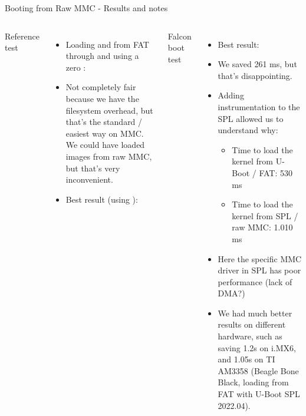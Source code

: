 \begin{frame}{Booting from Raw MMC - Results and notes}
  \scriptsize
  \begin{columns}
         Reference test
        \begin{itemize}
           \item Loading  and  from FAT through
                  and using a zero :\\
           \item Not completely fair because we have the filesystem overhead, but that's the standard / easiest way on MMC.
                 We could have loaded images from raw MMC, but that's very inconvenient.
           \item Best result (using ):\\
        \end{itemize}
        Falcon boot test
        \begin{itemize}
           \item Best result:\\
           \item We saved 261 ms, but that's disappointing.
           \item Adding instrumentation to the SPL allowed us to understand why:
           \begin{itemize}
              \scriptsize
              \item Time to load the kernel from U-Boot / FAT: 530 ms
              \item Time to load the kernel from SPL / raw MMC: 1.010 ms
           \end{itemize}
           \item Here the specific MMC driver in SPL has poor performance (lack
                 of DMA?)
           \item We had much better results on different hardware, such
                 as saving 1.2s on i.MX6, and 1.05s on TI AM3358
                 (Beagle Bone Black, loading from FAT with U-Boot SPL
                 2022.04).
        \end{itemize}
  \end{columns}
\end{frame}

